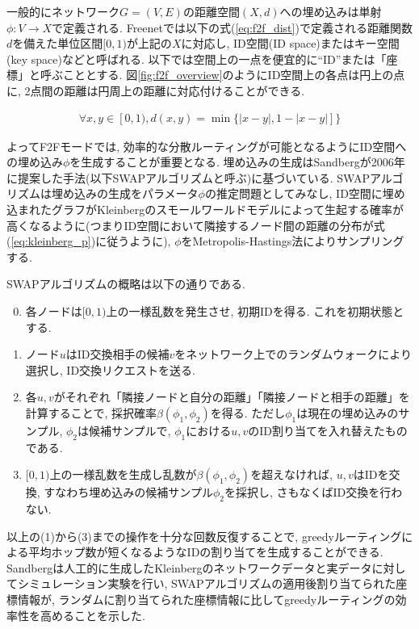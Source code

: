 \documentclass[technicalreport]{./ieicej-v3.0/UTF/ieicej}
\begin{document}
   一般的にネットワーク$G=(V,E)$の距離空間$(X,d)$への埋め込みは単射$\phi:V \to X$で定義される\cite{papadimitriou2005conjecture}. Freenetでは以下の式(\ref{eq:f2f_dist})で定義される距離関数$d$を備えた単位区間$[0,1)$が上記の$X$に対応し, ID空間(ID space)またはキー空間(key space)などと呼ばれる. 以下では空間上の一点を便宜的に``ID''または「座標」と呼ぶこととする. 図\ref{fig:f2f_overview}のようにID空間上の各点は円上の点に, 2点間の距離は円周上の距離に対応付けることができる.

   \begin{eqnarray}
    \forall x,y \in [0,1), d(x,y) = \min\{|x-y|, 1 - |x-y|]\} \label{eq:f2f_dist}
   \end{eqnarray}

   よってF2Fモードでは, 効率的な分散ルーティングが可能となるようにID空間への埋め込み$\phi$を生成することが重要となる. 埋め込みの生成はSandbergが2006年に提案した手法(以下SWAPアルゴリズムと呼ぶ)に基づいている\cite{sandberg2006distributed}. SWAPアルゴリズムは埋め込みの生成をパラメータ$\phi$の推定問題としてみなし, ID空間に埋め込まれたグラフがKleinbergのスモールワールドモデルによって生起する確率が高くなるように(つまりID空間において隣接するノード間の距離の分布が式(\ref{eq:kleinberg_p})に従うように), $\phi$をMetropolis-Hastings法によりサンプリングする.

   SWAPアルゴリズムの概略は以下の通りである.

   \begin{enumerate}
    \setcounter{enumi}{-1}
    \item
各ノードは$[0,1)$上の一様乱数を発生させ, 初期IDを得る. これを初期状態とする.

    \item
ノード$u$はID交換相手の候補$v$をネットワーク上でのランダムウォークにより選択し, ID交換リクエストを送る.

    \item
各$u,v$がそれぞれ「隣接ノードと自分の距離」「隣接ノードと相手の距離」を計算することで, 採択確率$\beta(\phi_1, \phi_2)$を得る. ただし$\phi_1$は現在の埋め込みのサンプル, $\phi_2$は候補サンプルで, $\phi_1$における$u,v$のID割り当てを入れ替えたものである.

    \item
$[0,1)$上の一様乱数を生成し乱数が$\beta(\phi_1, \phi_2)$を超えなければ, $u,v$はIDを交換, すなわち埋め込みの候補サンプル$\phi_2$を採択し, さもなくばID交換を行わない.
   \end{enumerate}

   以上の(1)から(3)までの操作を十分な回数反復することで, greedyルーティングによる平均ホップ数が短くなるようなIDの割り当てを生成することができる. Sandbergは人工的に生成したKleinbergのネットワークデータと実データに対してシミュレーション実験を行い, SWAPアルゴリズムの適用後割り当てられた座標情報が, ランダムに割り当てられた座標情報に比してgreedyルーティングの効率性を高めることを示した.
\end{document}
